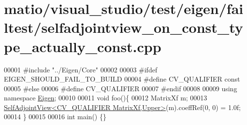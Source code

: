 \hypertarget{matio_2visual__studio_2test_2eigen_2failtest_2selfadjointview__on__const__type__actually__const_8cpp_source}{}\section{matio/visual\+\_\+studio/test/eigen/failtest/selfadjointview\+\_\+on\+\_\+const\+\_\+type\+\_\+actually\+\_\+const.cpp}
\label{matio_2visual__studio_2test_2eigen_2failtest_2selfadjointview__on__const__type__actually__const_8cpp_source}

\begin{DoxyCode}
00001 \textcolor{preprocessor}{#include "../Eigen/Core"}
00002 
00003 \textcolor{preprocessor}{#ifdef EIGEN\_SHOULD\_FAIL\_TO\_BUILD}
00004 \textcolor{preprocessor}{#define CV\_QUALIFIER const}
00005 \textcolor{preprocessor}{#else}
00006 \textcolor{preprocessor}{#define CV\_QUALIFIER}
00007 \textcolor{preprocessor}{#endif}
00008 
00009 \textcolor{keyword}{using namespace }\hyperlink{namespace_eigen}{Eigen};
00010 
00011 \textcolor{keywordtype}{void} foo()\{
00012     MatrixXf m;
00013     \hyperlink{group___core___module_class_eigen_1_1_self_adjoint_view}{SelfAdjointView<CV\_QUALIFIER MatrixXf,Upper>}(m).coeffRef(0,
       0) = 1.0f;
00014 \}
00015 
00016 \textcolor{keywordtype}{int} main() \{\}
\end{DoxyCode}
